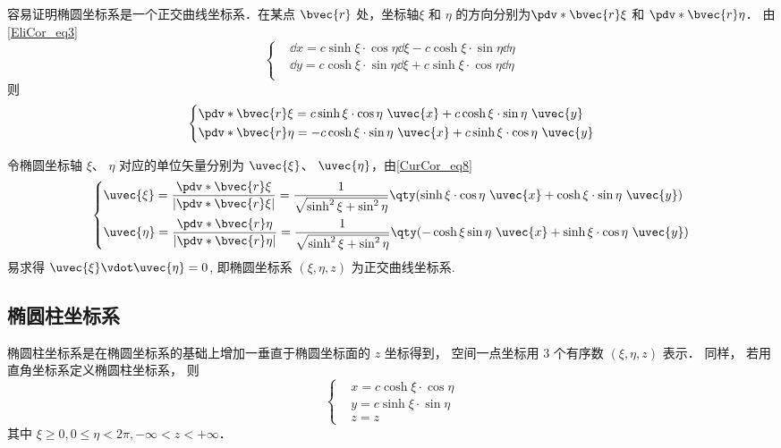 容易证明椭圆坐标系是一个正交曲线坐标系．在某点 $\bvec{r}$ 处，坐标轴$\xi$ 和 $\eta$ 的方向分别为$\pdv*{\bvec{r}}{\xi}$ 和 $\pdv*{\bvec{r}}{\eta}$．
由\autoref{EliCor_eq3} 
\begin{equation}
\left\{
    \begin{aligned}
    &\dd x=c\sinh\xi\cdot\cos\eta\dd\xi-c\cosh\xi\cdot\sin\eta\dd\eta\\
    &\dd y=c\cosh\xi\cdot\sin\eta\dd\xi+c\sinh\xi\cdot\cos\eta\dd\eta\\
    \end{aligned}\right.
\end{equation}
则
\begin{equation}
\left\{
    \begin{aligned}
&\pdv*{\bvec{r}}{\xi}=c\sinh\xi\cdot\cos\eta\ \uvec{x}+c\cosh\xi\cdot\sin\eta\ \uvec{y}\\
&\pdv*{\bvec{r}}{\eta}=-c\cosh\xi\cdot\sin\eta\ \uvec{x}+c\sinh\xi\cdot\cos\eta\ \uvec{y}\\
    \end{aligned}\right.
\end{equation}

令椭圆坐标轴 $\xi$、 $\eta$ 对应的单位矢量分别为 $\uvec{\xi}$、 $\uvec{\eta}$，由\autoref{CurCor_eq8}~
\begin{equation}
\left\{
    \begin{aligned}
    &\uvec{\xi}=\frac{\pdv*{\bvec{r}}{\xi}}{|\pdv*{\bvec{r}}{\xi}|}=\frac{1}{\sqrt{\sinh^2\xi+\sin^2\eta}}\qty(\sinh\xi\cdot\cos\eta\ \uvec{x}+\cosh\xi\cdot\sin\eta\ \uvec{y})\\
    &\uvec{\eta }=\frac{\pdv*{\bvec{r}}{\eta}}{|\pdv*{\bvec{r}}{\eta}|}=\frac{1}{\sqrt{\sinh^2\xi+\sin^2\eta}}\qty(-\cosh\xi\sin\eta\ \uvec{x}+\sinh\xi\cdot\cos\eta\ \uvec{y})\\
    \end{aligned}\right.
\end{equation}
易求得 $\uvec{\xi}\vdot\uvec{\eta} = 0$,  即椭圆坐标系 $(\xi,\eta,z)$ 为正交曲线坐标系.

\subsection{椭圆柱坐标系}
椭圆柱坐标系是在椭圆坐标系的基础上增加一垂直于椭圆坐标面的 $z$ 坐标得到， 空间一点坐标用 3 个有序数 $(\xi,\eta,z)$ 表示． 同样， 若用直角坐标系定义椭圆柱坐标系， 则
\begin{equation}\label{EliCor_eq1}
\left\{\begin{aligned}
&x=c\cosh\xi\cdot\cos\eta\\
&y=c\sinh\xi\cdot\sin\eta\\
&z=z
\end{aligned}\right.
\end{equation}
其中 $\xi\geq0,0\leq\eta<2\pi,-\infty<z<+\infty$．

